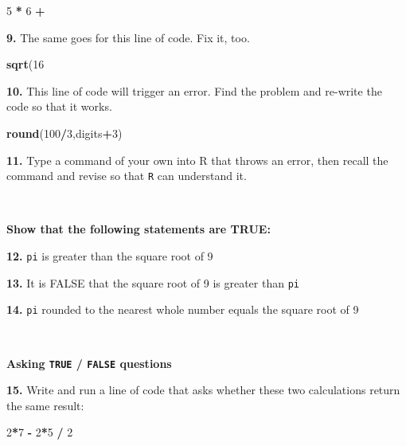 \documentclass[
]{book}
\newenvironment{Shaded}{\begin{snugshade}}{\end{snugshade}}
\newcommand{\DecValTok}[1]{\textcolor[rgb]{0.00,0.00,0.81}{#1}}
\newcommand{\KeywordTok}[1]{\textcolor[rgb]{0.13,0.29,0.53}{\textbf{#1}}}
\newcommand{\NormalTok}[1]{#1}
\newcommand{\OperatorTok}[1]{\textcolor[rgb]{0.81,0.36,0.00}{\textbf{#1}}}
\newcommand{\StringTok}[1]{\textcolor[rgb]{0.31,0.60,0.02}{#1}}
\begin{document}
\begin{Shaded}
\begin{Highlighting}[]
\DecValTok{5} \OperatorTok{*}\StringTok{ }\DecValTok{6} \OperatorTok{+}
\end{Highlighting}
\end{Shaded}

\textbf{9.} The same goes for this line of code. Fix it, too.

\begin{Shaded}
\begin{Highlighting}[]
\KeywordTok{sqrt}\NormalTok{(}\DecValTok{16}
\end{Highlighting}
\end{Shaded}

\textbf{10.} This line of code will trigger an error. Find the problem and re-write the code so that it works.

\begin{Shaded}
\begin{Highlighting}[]
\KeywordTok{round}\NormalTok{(}\DecValTok{100}\OperatorTok{/}\DecValTok{3}\NormalTok{,digits}\OperatorTok{+}\DecValTok{3}\NormalTok{)}
\end{Highlighting}
\end{Shaded}

\textbf{11.} Type a command of your own into R that throws an error, then recall the command and revise so that \texttt{R} can understand it.

~

\textbf{Show that the following statements are TRUE:}

\textbf{12.} \texttt{pi} is greater than the square root of 9

\textbf{13.} It is FALSE that the square root of 9 is greater than \texttt{pi}

\textbf{14.} \texttt{pi} rounded to the nearest whole number equals the square root of 9

~

\textbf{Asking \texttt{TRUE} / \texttt{FALSE} questions}

\textbf{15.} Write and run a line of code that asks whether these two calculations return the same result:

\begin{Shaded}
\begin{Highlighting}[]
\DecValTok{2}\OperatorTok{*}\DecValTok{7} \OperatorTok{-}\StringTok{ }\DecValTok{2}\OperatorTok{*}\DecValTok{5} \OperatorTok{/}\StringTok{ }\DecValTok{2}
\end{Highlighting}
\end{Shaded}
\end{document}
